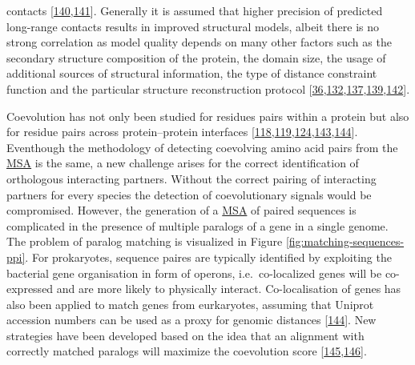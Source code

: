 \documentclass[11pt,a4paper,twoside]{book}
\theoremstyle{definition}
\theoremstyle{definition}
\theoremstyle{remark}
\begin{document}
contacts
{[}\protect\hyperlink{ref-Wang2016}{140},\protect\hyperlink{ref-Adhikari2015a}{141}{]}.
Generally it is assumed that higher precision of predicted long-range
contacts results in improved structural models, albeit there is no
strong correlation as model quality depends on many other factors such
as the secondary structure composition of the protein, the domain size,
the usage of additional sources of structural information, the type of
distance constraint function and the particular structure reconstruction
protocol
{[}\protect\hyperlink{ref-Marks2011}{36},\protect\hyperlink{ref-Kosciolek2014}{132},\protect\hyperlink{ref-Adhikari2017}{137},\protect\hyperlink{ref-Zhang2003}{139},\protect\hyperlink{ref-DeOliveira2016}{142}{]}.

Coevolution has not only been studied for residues pairs within a
protein but also for residue pairs across protein--protein interfaces
{[}\protect\hyperlink{ref-Ovchinnikov2014a}{118},\protect\hyperlink{ref-Hopf2014}{119},\protect\hyperlink{ref-Ovchinnikov2015a}{124},\protect\hyperlink{ref-Rodriguez-Rivas2016}{143},\protect\hyperlink{ref-Feinauer2016a}{144}{]}.
Eventhough the methodology of detecting coevolving amino acid pairs from
the \protect\hyperlink{abbrev}{MSA} is the same, a new challenge arises
for the correct identification of orthologous interacting partners.
Without the correct pairing of interacting partners for every species
the detection of coevolutionary signals would be compromised. However,
the generation of a \protect\hyperlink{abbrev}{MSA} of paired sequences
is complicated in the presence of multiple paralogs of a gene in a
single genome. The problem of paralog matching is visualized in Figure
\ref{fig:matching-sequences-ppi}. For prokaryotes, sequence paires are
typically identified by exploiting the bacterial gene organisation in
form of operons, i.e.~co-localized genes will be co-expressed and are
more likely to physically interact. Co-localisation of genes has also
been applied to match genes from eurkaryotes, assuming that Uniprot
accession numbers can be used as a proxy for genomic distances
{[}\protect\hyperlink{ref-Feinauer2016a}{144}{]}. New strategies have
been developed based on the idea that an alignment with correctly
matched paralogs will maximize the coevolution score
{[}\protect\hyperlink{ref-Gueudre2016}{145},\protect\hyperlink{ref-Bitbol2016}{146}{]}.
\end{document}
